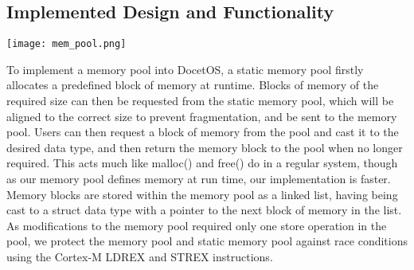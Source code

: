 \subsection{Implemented Design and Functionality}
\begin{center}
	\texttt{[image: mem\_pool.png]}
\end{center}
To implement a memory pool into DocetOS, a static memory pool firstly allocates a predefined block of memory at runtime. Blocks of memory of the required size can then be requested from the static memory pool, which will be aligned to the correct size to prevent fragmentation, and be sent to the memory pool.\hfill\newline
Users can then request a block of memory from the pool and cast it to the desired data type, and then return the memory block to the pool when no longer required. This acts much like malloc() and free() do in a regular system, though as our memory pool defines memory at run time, our implementation is faster.\hfill\newline
Memory blocks are stored within the memory pool as a linked list, having being cast to a struct data type with a pointer to the next block of memory in the list. As modifications to the memory pool required only one store operation in the pool, we protect the memory pool and static memory pool against race conditions using the Cortex-M LDREX and STREX instructions.